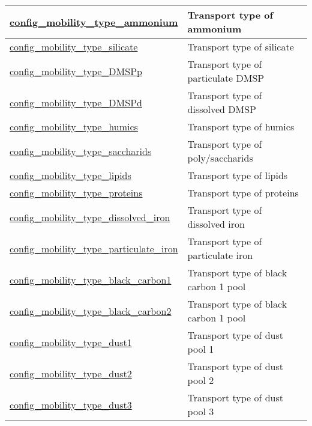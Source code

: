 {\begin{center}
\begin{longtable}{| p{2.0in} || p{4.0in} |}
    \hline
    \hyperref[subsec:nm_sec_config_mobility_type_ammonium]{config\_mobility\_type\_\-ammonium} & Transport type of ammonium \\
    \hline
    \hyperref[subsec:nm_sec_config_mobility_type_silicate]{config\_mobility\_type\_silicate} & Transport type of silicate \\
    \hline
    \hyperref[subsec:nm_sec_config_mobility_type_DMSPp]{config\_mobility\_type\_DMSPp} & Transport type of particulate DMSP \\
    \hline
    \hyperref[subsec:nm_sec_config_mobility_type_DMSPd]{config\_mobility\_type\_DMSPd} & Transport type of dissolved DMSP \\
    \hline
    \hyperref[subsec:nm_sec_config_mobility_type_humics]{config\_mobility\_type\_humics} & Transport type of humics \\
    \hline
    \hyperref[subsec:nm_sec_config_mobility_type_saccharids]{config\_mobility\_type\_\-saccharids} & Transport type of poly/saccharids \\
    \hline
    \hyperref[subsec:nm_sec_config_mobility_type_lipids]{config\_mobility\_type\_lipids} & Transport type of lipids \\
    \hline
    \hyperref[subsec:nm_sec_config_mobility_type_proteins]{config\_mobility\_type\_proteins} & Transport type of proteins \\
    \hline
    \hyperref[subsec:nm_sec_config_mobility_type_dissolved_iron]{config\_mobility\_type\_\-dissolved\_iron} & Transport type of dissolved iron \\
    \hline
    \hyperref[subsec:nm_sec_config_mobility_type_particulate_iron]{config\_mobility\_type\_\-particulate\_iron} & Transport type of particulate iron \\
    \hline
    \hyperref[subsec:nm_sec_config_mobility_type_black_carbon1]{config\_mobility\_type\_black\_\-carbon1} & Transport type of black carbon 1 pool \\
    \hline
    \hyperref[subsec:nm_sec_config_mobility_type_black_carbon2]{config\_mobility\_type\_black\_\-carbon2} & Transport type of black carbon 1 pool \\
    \hline
    \hyperref[subsec:nm_sec_config_mobility_type_dust1]{config\_mobility\_type\_dust1} & Transport type of dust pool 1 \\
    \hline
    \hyperref[subsec:nm_sec_config_mobility_type_dust2]{config\_mobility\_type\_dust2} & Transport type of dust pool 2 \\
    \hline
    \hyperref[subsec:nm_sec_config_mobility_type_dust3]{config\_mobility\_type\_dust3} & Transport type of dust pool 3 \\

\end{longtable}
\end{center}}
